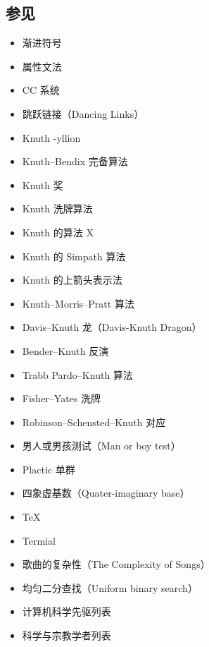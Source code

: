 \subsection{参见}
\begin{itemize}
\item 渐进符号
\item 属性文法
\item CC 系统
\item 跳跃链接（Dancing Links）
\item Knuth -yllion
\item Knuth–Bendix 完备算法
\item Knuth 奖
\item Knuth 洗牌算法
\item Knuth 的算法 X
\item Knuth 的 Simpath 算法
\item Knuth 的上箭头表示法
\item Knuth–Morris–Pratt 算法
\item Davis–Knuth 龙（Davis-Knuth Dragon）
\item Bender–Knuth 反演
\item Trabb Pardo–Knuth 算法
\item Fisher–Yates 洗牌
\item Robinson–Schensted–Knuth 对应
\item 男人或男孩测试（Man or boy test）
\item Plactic 单群
\item 四象虚基数（Quater-imaginary base）
\item TeX
\item Termial
\item 歌曲的复杂性（The Complexity of Songs）
\item 均匀二分查找（Uniform binary search）
\item 计算机科学先驱列表
\item 科学与宗教学者列表
\end{itemize}

